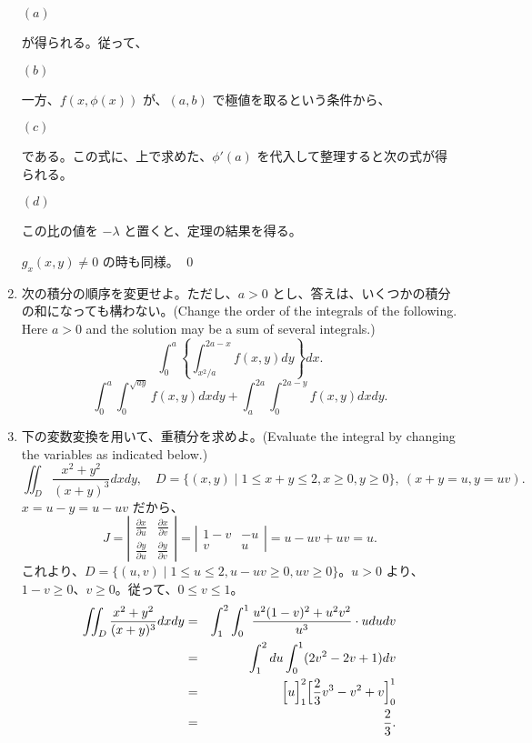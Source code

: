 \begin{enumerate}
$(a)$ 

が得られる。従って、

$(b)$ 

一方、$f(x,\phi(x))$ が、$(a,b)$ で極値を取るという条件から、

$(c)$ 

である。この式に、上で求めた、$\phi'(a)$  を代入して整理すると次の式が得られる。

$(d)$ 

この比の値を $-\lambda$ と置くと、定理の結果を得る。

$g_x(x,y) \neq 0$ の時も同様。
\qed

\item 次の積分の順序を変更せよ。ただし、$a>0$ とし、答えは、いくつかの積分の和になっても構わない。(Change the order of the integrals of the following.  Here $a>0$ and the solution may be a sum of several integrals.)
$$\int^a_0\left\{\int^{2a - x}_{x^2/a}f(x,y)dy\right\}dx.$$
\sol
$$\int_0^a\int_0^{\sqrt{ay}}f(x,y)dxdy + \int_a^{2a}\int_0^{2a-y}f(x,y)dxdy.$$

\item 下の変数変換を用いて、重積分を求めよ。(Evaluate the integral by changing the variables as indicated below.)
$$\iint_D \frac{x^2+y^2}{(x+y)^3}dxdy,\quad D = \{(x,y)\mid 1\leq x+y\leq 2, x\geq 0,y\geq 0\}, \:(x + y = u, y = uv).$$
\sol
$x = u - y = u - uv$ だから、
$$J = \left|\begin{array}{cc}
\frac{\partial x}{\partial u} & \frac{\partial x}{\partial v}\\ 
\frac{\partial y}{\partial u} & \frac{\partial y}{\partial v} \end{array}\right| 
= \left|\begin{array}{cc}1-v & -u \\ 
v & u \end{array}\right| 
= u - uv + uv = u.$$
これより、$D = \{(u,v)\mid 1\leq u\leq 2, u - uv\geq 0,uv\geq 0\}$。$u > 0$ より、$1 - v\geq 0$、$v\geq 0$。従って、$0\leq v\leq 1$。
\begin{eqnarray*}
\iint_D \frac{x^2+y^2}{(x+y)^3}dxdy & = & \int_1^2\int_0^1\frac{u^2(1-v)^2 + u^2v^2}{u^3}\cdot ududv\\
& = & \int_1^2du\int_0^1(2v^2 - 2v + 1)dv\\
& = & \Bigl[u\Bigr]_1^2\Bigl[\frac23v^3 - v^2 + v\Bigr]_0^1\\
& = & \frac23.
\end{eqnarray*}


\end{enumerate}
